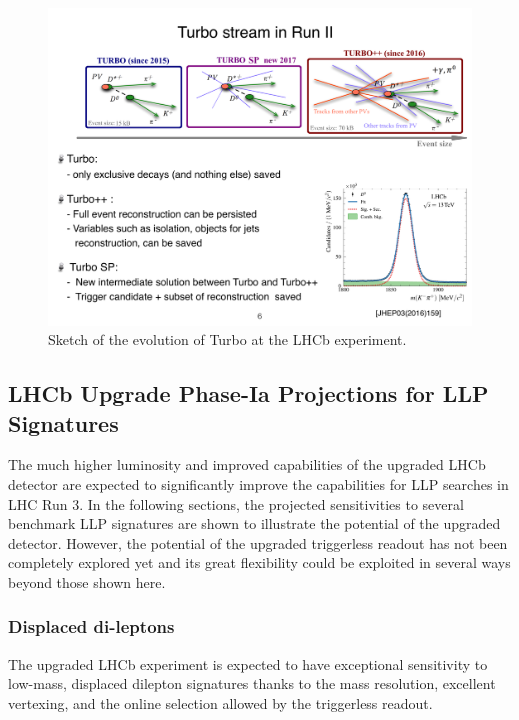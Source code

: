 \begin{figure}[t]
\centerline{\includegraphics[width=1.05\textwidth]{figures/Turbo.pdf}}
  \caption{Sketch of the evolution of Turbo at the LHCb experiment.}
  \label{fig:turbo}
\end{figure}

\subsection{LHCb Upgrade Phase-Ia Projections for LLP Signatures}
\label{sec:ulhcbphys}

The much higher luminosity and improved capabilities of the upgraded LHCb detector are expected to significantly improve the capabilities for LLP searches in LHC Run 3. In the following sections, the projected sensitivities to several benchmark LLP signatures are shown to illustrate the potential of the upgraded detector. However, the potential of the upgraded triggerless readout has not been completely explored yet and its great flexibility could be exploited in several ways beyond those shown here.

\subsubsection{Displaced di-leptons}

The upgraded LHCb experiment is expected to have exceptional sensitivity to low-mass, displaced dilepton signatures thanks to the mass resolution, excellent vertexing, and the online selection allowed by the triggerless readout.

